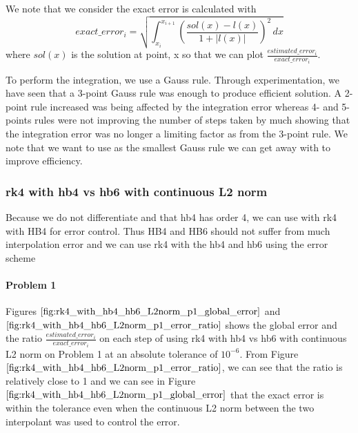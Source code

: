 We note that we consider the exact error is calculated with
\begin{equation}
exact\_error_i = \sqrt{ \int_{x_i}^{x_{i+1}} (\frac{sol(x) - l(x)}{1 + |l(x)|})^2 \,dx }
\end{equation}
where $sol(x)$ is the solution at point, x so that we can plot $\frac{estimated\_error_i}{exact\_error_i}$. 

To perform the integration, we use a Gauss rule. Through experimentation, we have seen that a 3-point Gauss rule was enough to produce efficient solution. A 2-point rule increased was being affected by the integration error whereas 4- and 5-points rules were not improving the number of steps taken by much showing that the integration error was no longer a limiting factor as from the 3-point rule. We note that we want to use as the smallest Gauss rule we can get away with to improve efficiency.

\subsubsection{rk4 with hb4 vs hb6 with continuous L2 norm}
Because we do not differentiate and that hb4 has order 4, we can use with rk4 with HB4 for error control. Thus HB4 and HB6 should not suffer from much interpolation error and we can use rk4 with the hb4 and hb6 using the error scheme


\paragraph{Problem 1} Figures $\ref{fig:rk4_with_hb4_hb6_L2norm_p1_global_error}$ and $\ref{fig:rk4_with_hb4_hb6_L2norm_p1_error_ratio}$ shows the global error and the ratio $\frac{estimated\_error_i}{exact\_error_i}$ on each step of using rk4 with hb4 vs hb6 with continuous L2 norm on Problem 1 at an absolute tolerance of $10^{-6}$. From Figure $\ref{fig:rk4_with_hb4_hb6_L2norm_p1_error_ratio}$, we can see that the ratio is relatively close to 1 and we can see in Figure  $\ref{fig:rk4_with_hb4_hb6_L2norm_p1_global_error}$ that the exact error is within the tolerance even when the continuous L2 norm between the two interpolant was used to control the error.

